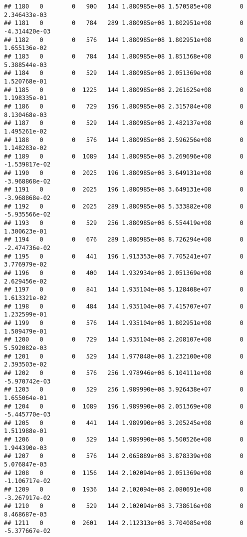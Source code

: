\documentclass[
]{article}
\begin{document}
\begin{enumerate}
\begin{verbatim}
## 1180   0        0   900   144 1.880985e+08 1.570585e+08        0  2.346433e-03
## 1181   0        0   784   289 1.880985e+08 1.802951e+08        0 -4.314420e-03
## 1182   0        0   576   144 1.880985e+08 1.802951e+08        0  1.655136e-02
## 1183   0        0   784   144 1.880985e+08 1.851368e+08        0  5.388544e-03
## 1184   0        0   529   144 1.880985e+08 2.051369e+08        0  1.520768e-01
## 1185   0        0  1225   144 1.880985e+08 2.261625e+08        0  1.198335e-01
## 1186   0        0   729   196 1.880985e+08 2.315784e+08        0  8.130468e-03
## 1187   0        0   529   144 1.880985e+08 2.482137e+08        0  1.495261e-02
## 1188   0        0   576   144 1.880985e+08 2.596256e+08        0  1.148283e-02
## 1189   0        0  1089   144 1.880985e+08 3.269696e+08        0 -1.539817e-02
## 1190   0        0  2025   196 1.880985e+08 3.649131e+08        0 -3.968868e-02
## 1191   0        0  2025   196 1.880985e+08 3.649131e+08        0 -3.968868e-02
## 1192   0        0  2025   289 1.880985e+08 5.333882e+08        0 -5.935566e-02
## 1193   0        0   529   256 1.880985e+08 6.554419e+08        0  1.300623e-01
## 1194   0        0   676   289 1.880985e+08 8.726294e+08        0 -2.474736e-02
## 1195   0        0   441   196 1.913353e+08 7.705241e+07        0  3.776979e-02
## 1196   0        0   400   144 1.932934e+08 2.051369e+08        0  2.629456e-02
## 1197   0        0   841   144 1.935104e+08 5.128408e+07        0  1.613321e-02
## 1198   0        0   484   144 1.935104e+08 7.415707e+07        0  1.232599e-01
## 1199   0        0   576   144 1.935104e+08 1.802951e+08        0  1.509479e-01
## 1200   0        0   729   144 1.935104e+08 2.208107e+08        0  5.592082e-03
## 1201   0        0   529   144 1.977848e+08 1.232100e+08        0  2.393503e-02
## 1202   0        0   576   256 1.978946e+08 6.104111e+08        0 -5.970742e-03
## 1203   0        0   529   256 1.989990e+08 3.926438e+07        0  1.655064e-01
## 1204   0        0  1089   196 1.989990e+08 2.051369e+08        0 -5.445770e-03
## 1205   0        0   441   144 1.989990e+08 3.205245e+08        0  1.511988e-01
## 1206   0        0   529   144 1.989990e+08 5.500526e+08        0  1.944390e-03
## 1207   0        0   576   144 2.065889e+08 3.878339e+08        0  5.076847e-03
## 1208   0        0  1156   144 2.102094e+08 2.051369e+08        0 -1.106717e-02
## 1209   0        0  1936   144 2.102094e+08 2.080691e+08        0 -3.267917e-02
## 1210   0        0   529   144 2.102094e+08 3.738616e+08        0  8.468687e-03
## 1211   0        0  2601   144 2.112313e+08 3.704085e+08        0 -5.377667e-02

\end{verbatim}
\end{enumerate}
\end{document}
